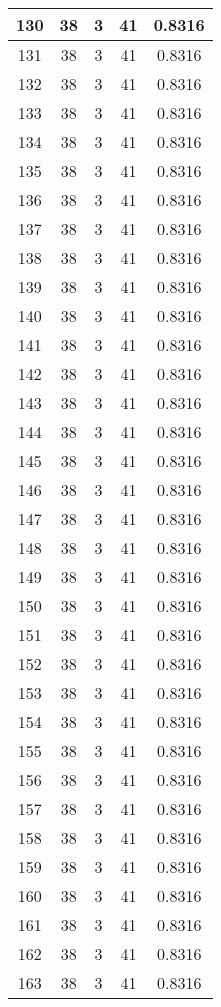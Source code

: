 \documentclass[letterpaper, 12pt]{article}
\begin{document}
\begin{longtable}{|c|c|c|c|c|}
\hline
130 & 38 & 3 & 41 & 0.8316 \\
\hline
131 & 38 & 3 & 41 & 0.8316 \\
\hline
132 & 38 & 3 & 41 & 0.8316 \\
\hline
133 & 38 & 3 & 41 & 0.8316 \\
\hline
134 & 38 & 3 & 41 & 0.8316 \\
\hline
135 & 38 & 3 & 41 & 0.8316 \\
\hline
136 & 38 & 3 & 41 & 0.8316 \\
\hline
137 & 38 & 3 & 41 & 0.8316 \\
\hline
138 & 38 & 3 & 41 & 0.8316 \\
\hline
139 & 38 & 3 & 41 & 0.8316 \\
\hline
140 & 38 & 3 & 41 & 0.8316 \\
\hline
141 & 38 & 3 & 41 & 0.8316 \\
\hline
142 & 38 & 3 & 41 & 0.8316 \\
\hline
143 & 38 & 3 & 41 & 0.8316 \\
\hline
144 & 38 & 3 & 41 & 0.8316 \\
\hline
145 & 38 & 3 & 41 & 0.8316 \\
\hline
146 & 38 & 3 & 41 & 0.8316 \\
\hline
147 & 38 & 3 & 41 & 0.8316 \\
\hline
148 & 38 & 3 & 41 & 0.8316 \\
\hline
149 & 38 & 3 & 41 & 0.8316 \\
\hline
150 & 38 & 3 & 41 & 0.8316 \\
\hline
151 & 38 & 3 & 41 & 0.8316 \\
\hline
152 & 38 & 3 & 41 & 0.8316 \\
\hline
153 & 38 & 3 & 41 & 0.8316 \\
\hline
154 & 38 & 3 & 41 & 0.8316 \\
\hline
155 & 38 & 3 & 41 & 0.8316 \\
\hline
156 & 38 & 3 & 41 & 0.8316 \\
\hline
157 & 38 & 3 & 41 & 0.8316 \\
\hline
158 & 38 & 3 & 41 & 0.8316 \\
\hline
159 & 38 & 3 & 41 & 0.8316 \\
\hline
160 & 38 & 3 & 41 & 0.8316 \\
\hline
161 & 38 & 3 & 41 & 0.8316 \\
\hline
162 & 38 & 3 & 41 & 0.8316 \\
\hline
163 & 38 & 3 & 41 & 0.8316 \\

\end{longtable}
\end{document}
